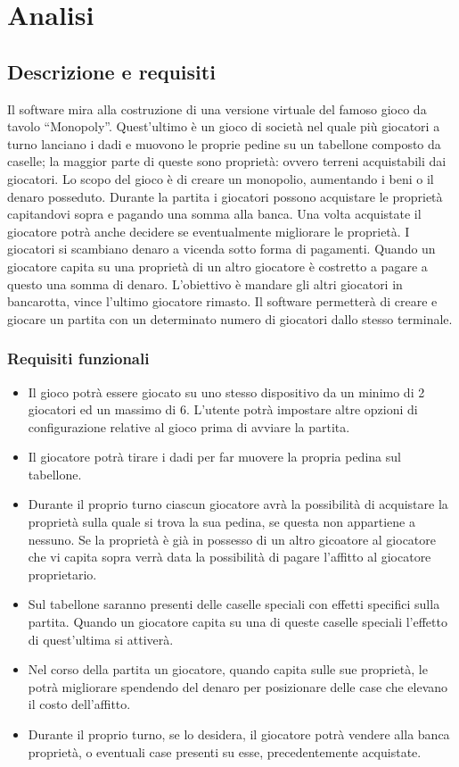 \chapter{Analisi}

\section{Descrizione e requisiti}

Il software mira alla costruzione di una versione virtuale del famoso gioco da tavolo “Monopoly”. 
Quest’ultimo è un gioco di società nel quale più giocatori a turno lanciano i dadi e muovono le proprie pedine su un tabellone 
composto da caselle; la maggior parte di queste sono proprietà: ovvero terreni acquistabili dai giocatori.
Lo scopo del gioco è di creare un monopolio, aumentando i beni o il denaro posseduto. 
Durante la partita i giocatori possono acquistare le proprietà capitandovi sopra e pagando una somma alla banca.
Una volta acquistate il giocatore potrà anche decidere se eventualmente migliorare le proprietà.
I giocatori si scambiano denaro a vicenda sotto 
forma di pagamenti. Quando un giocatore capita su una proprietà di un altro giocatore è costretto a pagare
a questo una somma di denaro. 
L’obiettivo è mandare gli altri giocatori in bancarotta, vince l’ultimo giocatore rimasto. 
Il software permetterà di creare e giocare un partita con un determinato numero di giocatori dallo 
stesso terminale.



\subsection*{Requisiti funzionali}
\begin{itemize}
    \item Il gioco potrà essere giocato su uno stesso dispositivo da un minimo di 2 giocatori ed un massimo di 6. L'utente
    potrà impostare altre opzioni di configurazione relative al gioco prima di avviare la partita.
	\item Il giocatore potrà tirare i dadi per far muovere la propria pedina sul tabellone.
	\item Durante il proprio turno ciascun giocatore avrà la possibilità di acquistare la proprietà sulla quale 
    si trova la sua pedina, se questa non appartiene a nessuno. Se la proprietà è già in possesso di un altro gicoatore 
    al giocatore che vi capita sopra verrà data la possibilità di pagare l’affitto al giocatore proprietario.
    \item Sul tabellone saranno presenti delle caselle speciali con effetti specifici sulla partita. Quando un giocatore 
    capita su una di queste caselle speciali l'effetto di quest'ultima si attiverà.
    \item Nel corso della partita un giocatore, quando capita sulle sue proprietà, le potrà migliorare spendendo
    del denaro per posizionare delle case che elevano il costo dell’affitto.
    \item Durante il proprio turno, se lo desidera, il giocatore potrà vendere alla banca 
    proprietà, o eventuali case presenti su esse, precedentemente acquistate.
\end{itemize}


